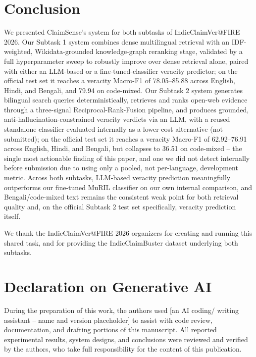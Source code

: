 \documentclass[
]{ceurart}
\begin{document}
\section{Conclusion}

We presented ClaimSense's system for both subtasks of
IndicClaimVer@FIRE 2026. Our Subtask 1 system combines dense
multilingual retrieval with an IDF-weighted, Wikidata-grounded
knowledge-graph reranking stage, validated by a full hyperparameter
sweep to robustly improve over dense retrieval alone, paired with
either an LLM-based or a fine-tuned-classifier veracity predictor; on
the official test set it reaches a veracity Macro-F1 of 78.05--85.88
across English, Hindi, and Bengali, and 79.94 on code-mixed. Our
Subtask 2 system generates bilingual search queries deterministically,
retrieves and ranks open-web evidence through a three-signal
Reciprocal-Rank-Fusion pipeline, and produces grounded,
anti-hallucination-constrained veracity verdicts via an LLM, with a
reused standalone classifier evaluated internally as a lower-cost
alternative (not submitted); on the official test set it reaches a
veracity Macro-F1 of 62.92--76.91 across English, Hindi, and Bengali,
but collapses to 36.51 on code-mixed -- the single most actionable
finding of this paper, and one we did not detect internally before
submission due to using only a pooled, not per-language, development
metric. Across both subtasks, LLM-based veracity prediction
meaningfully outperforms our fine-tuned MuRIL classifier on our own
internal comparison, and Bengali/code-mixed text remains the consistent
weak point for both retrieval quality and, on the official Subtask 2
test set specifically, veracity prediction itself.

\begin{acknowledgments}
We thank the IndicClaimVer@FIRE 2026 organizers for creating and
running this shared task, and for providing the IndicClaimBuster
dataset underlying both subtasks.
\end{acknowledgments}

\section*{Declaration on Generative AI}
During the preparation of this work, the authors used [an AI coding/
writing assistant -- name and version placeholder] to assist with code
review, documentation, and drafting portions of this manuscript. All
reported experimental results, system designs, and conclusions were
reviewed and verified by the authors, who take full responsibility for
the content of this publication.


\end{document}
